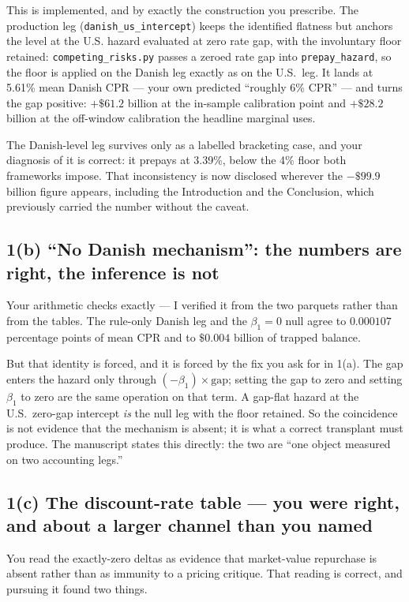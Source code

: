 \documentclass[11pt]{article}
\newcommand{\run}[1]{\texttt{#1}}
\begin{document}
This is implemented, and by exactly the construction you prescribe. The
production leg (\run{danish\_us\_intercept}) keeps the identified flatness but
anchors the level at the U.S. hazard evaluated at zero rate gap, with the
involuntary floor retained: \texttt{competing\_risks.py} passes a zeroed rate gap
into \texttt{prepay\_hazard}, so the floor is applied on the Danish leg exactly as
on the U.S.\ leg. It lands at 5.61\% mean Danish CPR --- your own predicted
``roughly 6\% CPR'' --- and turns the gap positive: $+\$61.2$ billion at the
in-sample calibration point and $+\$28.2$ billion at the off-window calibration
the headline marginal uses.

The Danish-level leg survives only as a labelled bracketing case, and your
diagnosis of it is correct: it prepays at 3.39\%, below the 4\% floor both
frameworks impose. That inconsistency is now disclosed wherever the
$-\$99.9$ billion figure appears, including the Introduction and the Conclusion,
which previously carried the number without the caveat.

\subsection{1(b) ``No Danish mechanism'': the numbers are right, the inference
is not}

Your arithmetic checks exactly --- I verified it from the two parquets rather
than from the tables. The rule-only Danish leg and the $\beta_1 = 0$ null agree
to $0.000107$ percentage points of mean CPR and to $\$0.004$ billion of trapped
balance.

But that identity is forced, and it is forced by the fix you ask for in 1(a). The
gap enters the hazard only through $(-\beta_1) \times \text{gap}$; setting the gap
to zero and setting $\beta_1$ to zero are the same operation on that term. A
gap-flat hazard at the U.S.\ zero-gap intercept \emph{is} the null leg with the
floor retained. So the coincidence is not evidence that the mechanism is absent;
it is what a correct transplant must produce. The manuscript states this
directly: the two are ``one object measured on two accounting legs.''

\subsection{1(c) The discount-rate table --- you were right, and about a larger
channel than you named}

You read the exactly-zero deltas as evidence that market-value repurchase is
absent rather than as immunity to a pricing critique. That reading is correct,
and pursuing it found two things.
\end{document}
